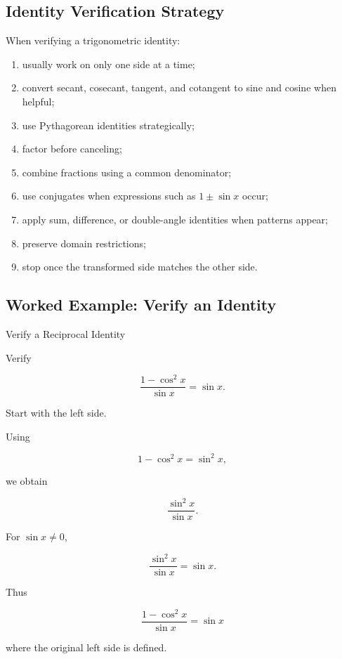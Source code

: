 \subsection{Identity Verification Strategy}
\label{subsec:identity-verification-strategy}

When verifying a trigonometric identity:

\begin{enumerate}
    \item usually work on only one side at a time;
    \item convert secant, cosecant, tangent, and cotangent to sine and cosine
          when helpful;
    \item use Pythagorean identities strategically;
    \item factor before canceling;
    \item combine fractions using a common denominator;
    \item use conjugates when expressions such as \(1\pm\sin x\) occur;
    \item apply sum, difference, or double-angle identities when patterns
          appear;
    \item preserve domain restrictions;
    \item stop once the transformed side matches the other side.
\end{enumerate}

\subsection{Worked Example: Verify an Identity}
\label{subsec:worked-verify-identity}

\begin{workedexamplebox}{Verify a Reciprocal Identity}

Verify

\[
\frac{1-\cos^2x}{\sin x}
=
\sin x.
\]

Start with the left side.

Using

\[
1-\cos^2x
=
\sin^2x,
\]

we obtain

\[
\frac{\sin^2x}{\sin x}.
\]

For \(\sin x\neq0\),

\[
\frac{\sin^2x}{\sin x}
=
\sin x.
\]

Thus

\begin{answerbox}
\[
\boxed{
\frac{1-\cos^2x}{\sin x}
=
\sin x
}
\]

where the original left side is defined.
\end{answerbox}

\end{workedexamplebox}

